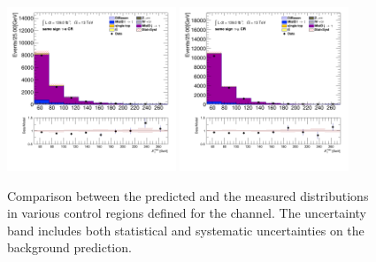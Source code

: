 \begin{figure}[!htp]
\begin{center}
			\includegraphics[width=0.45\textwidth]{chapters/chapter6_HPlus/images/taulep/met_et_SS_TAUEL.png} 
			\includegraphics[width=0.45\textwidth]{chapters/chapter6_HPlus/images/taulep/met_et_SS_TAUMU.png} \\
			\end{center}
			\caption{
			Comparison between the predicted and the measured \Etm distributions in various control regions defined for the \taulep channel. The uncertainty band includes both statistical and systematic uncertainties on the background prediction. 
			}
			\label{fig:bkg-met-taulep}
		\end{figure}

